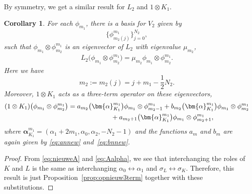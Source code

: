 \documentclass[10pt,a4paper]{amsart}
\numberwithin{equation}{section}
\newtheorem{Corollary}[Theorem]{Corollary}
\newcommand{\half}{\frac{1}{2}}
\begin{document}
By symmetry, we get a similar result for $L_2$ and $1\otimes K_1$.
\begin{Corollary}\label{cor:3termomgedraaid}
	For each $\phi_{m_1}$, there is a basis for $V_2$ given by
	\[
	\big\{\phi_{m_2(j)}^{m_1}\big\}_{j=0}^{N_2},
	\]
	such that $\phi_{m_1}\otimes\phi_{m_2}^{m_1}$ is an eigenvector of $L_2$ with eigenvalue $\mu_{m_2}$,
	\begin{gather*}
		L_2\big(\phi_{m_1}\otimes\phi_{m_2}^{m_1}\big) = \mu_{m_2}\phi_{m_1}\otimes\phi_{m_2}^{m_1}.
	\end{gather*}
	Here we have
	\[
	m_2:=m_2(j)=j+m_1-\half N_2.
	\]
	Moreover, $1\otimes K_1$ acts as a three-term operator on these eigenvectors,
	\begin{gather*}
(1\otimes K_1)\big(\phi_{m_1}\otimes\phi_{m_2}^{m_1}\big)= a_{m_2}\big(\bm{\alpha}_{K_1}^{m_1}\big) \phi_{m_1}\otimes\phi_{m_2-1}^{m_1} + b_{m_2}\big(\bm{\alpha}_{K_1}^{m_1}\big) \phi_{m_1}\otimes\phi_{m_2}^{m_1} \\
\hphantom{(1\otimes K_1)\big(\phi_{m_1}\otimes\phi_{m_2}^{m_1}\big)=}{}
+ a_{m_2+1}\big(\bm{\alpha}_{K_1}^{m_1}\big)\phi_{m_1}\otimes\phi_{m_2+1}^{m_1} ,
	\end{gather*}
	where $\bm{\alpha}_{K_1}^{m_1}=(\alpha_1+2m_1,\alpha_0,\alpha_2,-N_2-1)$ and the functions $a_{m}$ and $b_{m}$ are again given by \eqref{eq:annew} and~\eqref{eq:bnnew}.
\end{Corollary}
\begin{proof}
From \eqref{eq:nieuweA} and \eqref{eq:Aalpha}, we see that interchanging the roles of $K$ and $L$ is the same as interchanging $\alpha_0\leftrightarrow \alpha_1$ and $\sigma_L\leftrightarrow \sigma_K$. Therefore, this result is just Proposition~\ref{prop:opnieuw3term} together with these substitutions.
\end{proof}
\end{document}
